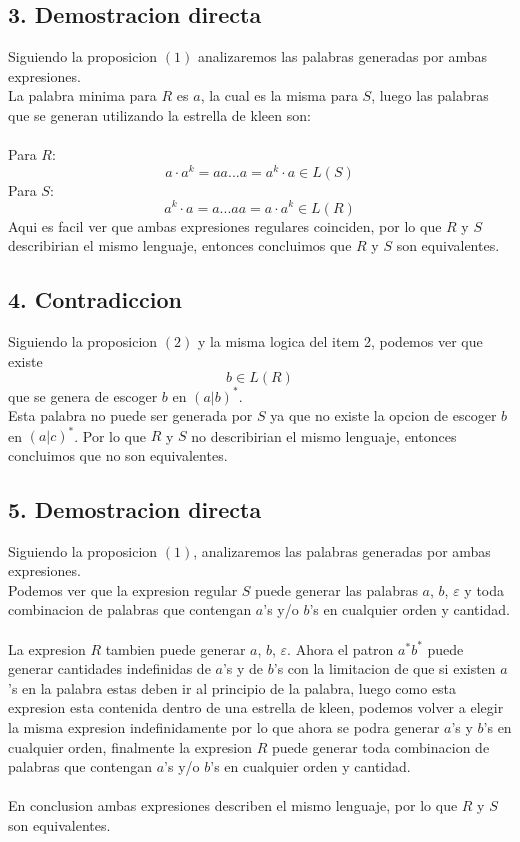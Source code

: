 \documentclass[spanish, draft]{article}
\begin{document}
	\subsection*{3. Demostracion directa}
    	Siguiendo la proposicion $(1)$ analizaremos las palabras generadas por ambas expresiones.\\
        La palabra minima para $R$ es $a$, la cual es la misma para $S$, luego las palabras que se generan utilizando la estrella de kleen son:\\\\
        Para $R$:
        $$a \cdot a^k = aa...a = a^k \cdot a \in L(S)$$
        Para $S$:
        $$a^k \cdot a = a...aa = a \cdot a^k \in L(R)$$
		Aqui es facil ver que ambas expresiones regulares coinciden, por lo que $R$ y $S$ describirian el mismo lenguaje, entonces concluimos que $R$ y $S$ son equivalentes.
        
	\subsection*{4. Contradiccion}
		Siguiendo la proposicion $(2)$ y la misma logica del item 2, podemos ver que existe
        $$b \in L(R)$$
        que se genera de escoger $b$ en $(a|b)^*$.\\
        Esta palabra no puede ser generada por $S$ ya que no existe la opcion de escoger $b$ en $(a|c)^*$. Por lo que $R$ y $S$ no describirian el mismo lenguaje, entonces concluimos que no son equivalentes.
        
	\subsection*{5. Demostracion directa}
    	Siguiendo la proposicion $(1)$, analizaremos las palabras generadas por ambas expresiones.\\
		Podemos ver que la expresion regular $S$ puede generar las palabras $a$, $b$, $\varepsilon$ y toda combinacion de palabras que contengan $a$'s y/o $b$'s en cualquier orden y cantidad.\\\\
		La expresion $R$ tambien puede generar $a$, $b$, $\varepsilon$. Ahora el patron $a^*b^*$ puede generar cantidades indefinidas de $a$'s y de $b$'s con la limitacion de que si existen $a$'s en la palabra estas deben ir al principio de la palabra, luego como esta expresion esta contenida dentro de una estrella de kleen, podemos volver a elegir la misma expresion indefinidamente por lo que ahora se podra generar $a$'s y $b$'s en cualquier orden, finalmente la expresion $R$ puede generar toda combinacion de palabras que contengan $a$'s y/o $b$'s en cualquier orden y cantidad.\\\\
		En conclusion ambas expresiones describen el mismo lenguaje, por lo que $R$ y $S$ son equivalentes.
\end{document}
